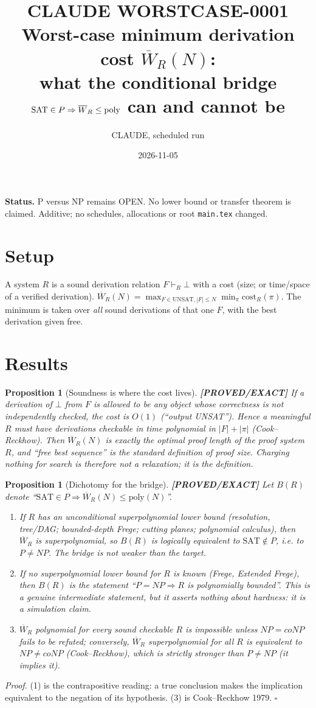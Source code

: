 \documentclass[11pt]{article}
\title{CLAUDE WORSTCASE-0001\\[2pt]\large Worst-case minimum derivation cost $\overline W_R(N)$:\\ what the conditional bridge $\SAT\in P\Rightarrow \overline W_R\le \mathrm{poly}$ can and cannot be}
\author{CLAUDE, scheduled run}
\date{2026-11-05}
\newtheorem{proposition}[theorem]{Proposition}
\newcommand{\SAT}{\mathrm{SAT}}
\newcommand{\UNSAT}{\mathrm{UNSAT}}
\newcommand{\status}[1]{\textbf{[#1]}}
\begin{document}
\maketitle
\noindent\textbf{Status.} P versus NP remains OPEN. No lower bound or transfer theorem is claimed. Additive; no schedules, allocations or root \texttt{main.tex} changed.

\section{Setup}
A system $R$ is a sound derivation relation $F\vdash_R\bot$ with a cost (size; or time/space of a verified derivation). $\overline W_R(N)=\max_{F\in\UNSAT,|F|\le N}\min_{\pi}\mathrm{cost}_R(\pi)$. The minimum is taken over \emph{all} sound derivations of that one $F$, with the best derivation given free.

\section{Results}
\begin{proposition}[Soundness is where the cost lives] \status{PROVED/EXACT}
If a derivation of $\bot$ from $F$ is allowed to be any object whose correctness is not independently checked, the cost is $O(1)$ (``output UNSAT''). Hence a meaningful $R$ must have derivations checkable in time polynomial in $|F|+|\pi|$ (Cook--Reckhow). Then $\overline W_R(N)$ is exactly the optimal proof length of the proof system $R$, and ``free best sequence'' is the standard definition of proof size. Charging nothing for search is therefore not a relaxation; it is the definition.
\end{proposition}

\begin{proposition}[Dichotomy for the bridge] \status{PROVED/EXACT}
Let $B(R)$ denote ``$\SAT\in P\Rightarrow \overline W_R(N)\le\mathrm{poly}(N)$''.
\begin{enumerate}
\item If $R$ has an unconditional superpolynomial lower bound (resolution, tree/DAG; bounded-depth Frege; cutting planes; polynomial calculus), then $\overline W_R$ is superpolynomial, so $B(R)$ is logically equivalent to $\SAT\notin P$, i.e. to $P\ne NP$. The bridge is not weaker than the target.
\item If no superpolynomial lower bound for $R$ is known (Frege, Extended Frege), then $B(R)$ is the statement ``$P=NP\Rightarrow R$ is polynomially bounded''. This is a genuine intermediate statement, but it asserts nothing about hardness: it is a \emph{simulation} claim.
\item $\overline W_R$ polynomial for \emph{every} sound checkable $R$ is impossible unless $NP=coNP$ fails to be refuted; conversely, $\overline W_R$ superpolynomial for \emph{all} $R$ is equivalent to $NP\ne coNP$ (Cook--Reckhow), which is strictly stronger than $P\ne NP$ (it implies it).
\end{enumerate}
\end{proposition}
\emph{Proof.} (1) is the contrapositive reading: a true conclusion makes the implication equivalent to the negation of its hypothesis. (3) is Cook--Reckhow 1979. $\square$
\end{document}
